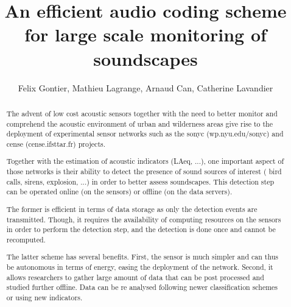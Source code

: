 \documentclass[preprint,12pt]{elsarticle}
\begin{document}
\begin{frontmatter}



\title{An efficient audio coding scheme for large scale monitoring of soundscapes}


\author{Felix Gontier, Mathieu Lagrange, Arnaud Can, Catherine Lavandier}

\address{felix.gontier@reseau.eseo.fr\\mathieu.lagrange@cnrs.fr}

\begin{abstract}
The advent of low cost acoustic sensors together with the need to better monitor and comprehend the acoustic environment of urban and wilderness areas give rise to the deployment of experimental sensor networks such as the sonyc (wp.nyu.edu/sonyc) and cense (cense.ifsttar.fr) projects.

Together with the estimation of acoustic indicators (LAeq, ...), one important aspect of those networks is their ability to detect the presence of sound sources of interest ( bird calls, sirens, explosion, ...) in order to better assess soundscapes. This detection step can be operated online (on the sensors) or offline (on the data servers).

The former is efficient in terms of data storage as only the detection events are transmitted. Though, it requires the availability of computing resources on the sensors in order to perform the detection step, and the detection is done once and cannot be recomputed.

The latter scheme has several benefits. First, the sensor is much simpler and can thus be autonomous in terms of energy, easing the deployment of the network. Second, it allows researchers to gather large amount of data that can be post processed and studied further offline. Data can be re analysed following newer classification schemes or using new indicators.


\end{abstract}
\end{frontmatter}
\end{document}
